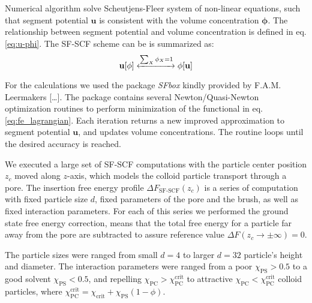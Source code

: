 \documentclass[12pt, a4paper]{article}
\begin{document}
Numerical algorithm solve Scheutjens-Fleer system of non-linear equations, such that segment potential $\mathbf{u}$ is consistent with the volume concentration $\mathbf{\phi}$.
The relationship between segment potential and volume concentration is defined in eq. \ref{eq:u-phi}.
The SF-SCF scheme can be is summarized as:
\begin{equation}
    \mathbf{u}[\mathbf{\phi}] \xleftrightarrow[]{\sum_{X} \phi_X = 1} \mathbf{\phi}[\mathbf{u}]
\end{equation}

For the calculations we used the package \emph{SFbox} kindly provided by F.A.M. Leermakers [\dots].
The package contains several Newton/Quasi-Newton optimization routines to perform minimization of the functional in eq.\ref{eq:fe_lagrangian}.
Each iteration returns a new improved approximation to segment potential $\mathbf{u}$, and updates volume concentrations.
The routine loops until the desired accuracy is reached.

We executed a large set of SF-SCF computations with the particle center position $z_{c}$ moved along $z$-axis, which models the colloid particle transport through a pore.
The insertion free energy profile $\Delta F_{\textrm{SF-SCF}}(z_c)$ is a series of computation with fixed particle size $d$, fixed parameters of the pore and the brush, as well as fixed interaction parameters.
For each of this series we performed the ground state free energy correction, means that the total free energy for a particle far away from the pore are subtracted to assure reference value $\Delta F(z_c \to \pm \infty) = 0$.

The particle sizes were ranged from small $d=4$ to  larger $d=32$ particle's height and diameter.
The interaction parameters were ranged from a poor $\chi_{\textrm{PS}} > 0.5$ to a good solvent $\chi_{\textrm{PS}} < 0.5$, and repelling  $\chi_{\textrm{PC}} > \chi_{\textrm{PC}}^{\textrm{crit}}$ to attractive $\chi_{\textrm{PC}} < \chi_{\textrm{PC}}^{\textrm{crit}}$ colloid particles, where $\chi_{\textrm{PC}}^{\textrm{crit}} = \chi_{\textrm{crit}} + \chi_{\textrm{PS}}(1-\phi)$.
\end{document}
